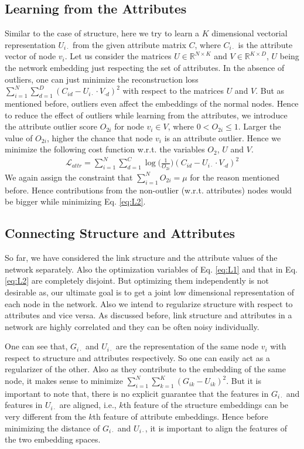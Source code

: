 \documentclass[letterpaper]{article} %
\begin{document}
\subsection{Learning from the Attributes}
Similar to the case of structure, here we try to learn a $K$ dimensional vectorial representation $U_{i\cdot}$ from the given attribute matrix $C$, where $C_{i\cdot}$ is the attribute vector of node $v_i$. Let us consider the matrices $U \in \mathbb{R}^{N \times K}$ and $V \in \mathbb{R}^{K \times D}$, $U$ being the network embedding just respecting the set of attributes. In the absence of outliers, one can just minimize the reconstruction loss $\sum\limits_{i=1}^N\sum\limits_{d=1}^D (C_{id} - U_{i\cdot} \cdot V_{\cdot d})^2$ with respect to the matrices $U$ and $V$. But as mentioned before, outliers even affect the embeddings of the normal nodes. Hence to reduce the effect of outliers while learning from the attributes, we introduce the attribute outlier score $O_{2i}$ for node $v_i \in V$, where $0 < O_{2i} \leq 1$. Larger the value of $O_{2i}$, higher the chance that node $v_i$ is an attribute outlier. Hence we minimize the following cost function w.r.t. the variables $O_2$, $U$ and $V$.
\begin{align}\label{eq:L2}
\mathcal{L}_{attr} = \sum_{i=1}^N\sum_{d=1}^C\log\Big({\frac{1}{O_{2i}}}\Big) (C_{id} - U_{i \cdot} \cdot V_{\cdot d})^2
\end{align}
We again assign the constraint that $\sum\limits_{i=1}^N O_{2i} = \mu$ for the reason mentioned before. Hence contributions from the non-outlier (w.r.t. attributes) nodes would be bigger while minimizing Eq. \ref{eq:L2}.

\subsection{Connecting Structure and Attributes}
So far, we have considered the link structure and the attribute values of the
network separately. Also the optimization variables of Eq. \ref{eq:L1} and that in Eq. \ref{eq:L2} are completely disjoint. But optimizing them independently is not desirable as, our ultimate goal is to get a joint low dimensional representation of each node in the network. Also we intend to regularize structure with respect to attributes and vice versa. As discussed before, link structure and attributes in a network are highly correlated and they can be often noisy individually.

One can see that, $G_{i \cdot}$ and $U_{i \cdot}$ are the representation of the same node $v_i$ with respect to structure and attributes respectively. So one can easily act as a regularizer of the other. Also as they contribute to the embedding of the same node, it makes sense to minimize $\sum\limits_{i=1}^N \sum\limits_{k=1}^K (G_{ik} - U_{ik})^2$. But it is important to note that, there is no explicit guarantee that the features in $G_{i \cdot}$ and features in $U_{i \cdot}$ are aligned, i.e., $k$th feature of the structure embeddings can be very different from the $k$th feature of attribute embeddings. Hence before minimizing the distance of $G_{i \cdot}$ and $U_{i \cdot}$, it is important to align the features of the two embedding spaces.
\end{document}

